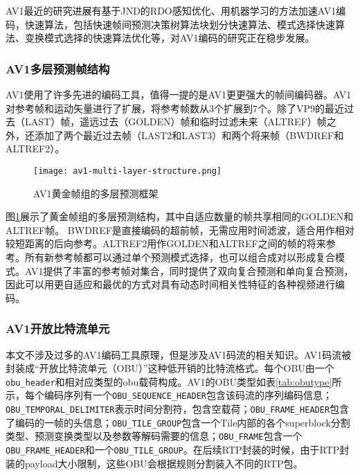 AV1最近的研究进展有基于JND的RDO感知优化\cite{zhuJNDbasedPerceptualRate2019}、用机器学习的方法加速AV1编码\cite{suMachineLearningAccelerated2019, dingCNNbasedInloopFiltering2019}，快速算法，包括快速帧间预测决策树算法\cite{kimFastInterPredictionBased2019}块划分快速算法\cite{guoFastBlockStructure2018}、模式选择快速算法\cite{jeongFastIntraMode2019}、变换模式选择的快速算法优化\cite{luEfficientRatedistortionApproximation2018}等，对AV1编码的研究正在稳步发展。
\subsubsection{AV1多层预测帧结构}


AV1使用了许多先进的编码工具，值得一提的是AV1更更强大的帧间编码器。AV1对参考帧和运动矢量进行了扩展，将参考帧数从3个扩展到7个。除了VP9的最近过去（LAST）帧，遥远过去（GOLDEN）帧和临时过滤未来（ALTREF）帧之外，还添加了两个最近过去帧（LAST2和LAST3）和两个将来帧（BWDREF和ALTREF2）\cite{linEfficientAV1Video2018}。

\begin{figure}[!htp]
	\centering
	\texttt{[image: av1-multi-layer-structure.png]}
	\caption{AV1黄金帧组的多层预测框架\cite{chenOverviewCoreCoding2018}}
	\label{fig:av1-multi-layer-structure}
\end{figure}

图\ref{fig:av1-multi-layer-structure}展示了黄金帧组的多层预测结构\cite{chenOverviewCoreCoding2018}，其中自适应数量的帧共享相同的GOLDEN和ALTREF帧。 BWDREF是直接编码的超前帧，无需应用时间滤波，适合用作相对较短距离的后向参考。ALTREF2用作GOLDEN和ALTREF之间的帧的将来参考。所有新参考帧都可以通过单个预测模式选择，也可以组合成对以形成复合模式。AV1提供了丰富的参考帧对集合，同时提供了双向复合预测和单向复合预测，因此可以用更自适应和最优的方式对具有动态时间相关性特征的各种视频进行编码。

\subsubsection{AV1开放比特流单元}
本文不涉及过多的AV1编码工具原理，但是涉及AV1码流的相关知识。AV1码流被封装成“开放比特流单元（OBU）”这种低开销的比特流格式。每个OBU由一个\texttt{obu\_header}和相对应类型的obu载荷构成。AV1的OBU类型如表\ref{tab:obutype}所示，每个编码序列有一个\texttt{OBU\_SEQUENCE\_HEADER}包含该码流的序列编码信息；\texttt{OBU\_TEMPORAL\_DELIMITER}表示时间分割符，包含空载荷；\texttt{OBU\_FRAME\_HEADER}包含了编码的一帧的头信息；\texttt{OBU\_TILE\_GROUP}包含一个Tile内部的各个superblock分割类型、预测变换类型以及参数等解码需要的信息；\texttt{OBU\_FRAME}包含一个\texttt{OBU\_FRAME\_HEADER}和一个\texttt{OBU\_TILE\_GROUP}。在后续RTP封装的时候，由于RTP封装的payload大小限制，这些OBU会根据规则分割装入不同的RTP包。

